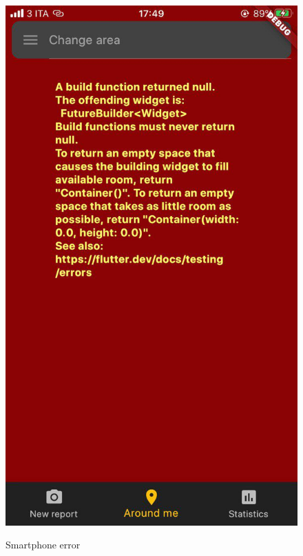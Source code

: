\documentclass[../ATD.tex]{subfiles}
\begin{document}
    \begin{figure}[H]
        \centering
        \includegraphics[scale = 0.4]{assets/smartphone_error.png}\\
        \caption[SMartphone error, \textit{Error}]{Smartphone error}
    \end{figure}
\end{document}
